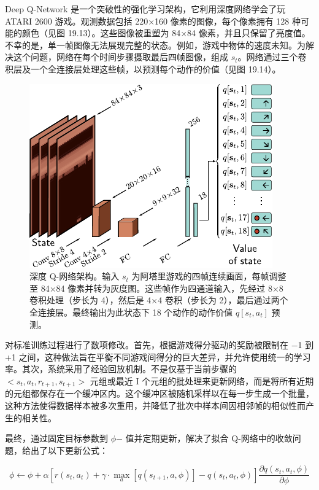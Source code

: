 \documentclass[lang=cn,newtx,10pt,scheme=chinese]{elegantbook}
\begin{document}
Deep Q-Network 是一个突破性的强化学习架构，它利用深度网络学会了玩 ATARI 2600 游戏。观测数据包括 220×160 像素的图像，每个像素拥有 128 种可能的颜色（见图 19.13）。这些图像被重塑为 84×84 像素，并且只保留了亮度值。不幸的是，单一帧图像无法展现完整的状态。例如，游戏中物体的速度未知。为解决这个问题，网络在每个时间步骤摄取最后四帧图像，组成 \(s_t\)。网络通过三个卷积层及一个全连接层处理这些帧，以预测每个动作的价值（见图 19.14）。


\begin{figure}[ht!]
\centering
\includegraphics[width=0.7\linewidth]{PDFFigures/UDLChap19PDF/ReinforceDQL2.pdf}
\caption{深度 Q-网络架构。输入 \(s_t\) 为阿塔里游戏的四帧连续画面，每帧调整至 84×84 像素并转为灰度图。这些帧作为四通道输入，先经过 8×8 卷积处理（步长为 4），然后是 4×4 卷积（步长为 2），最后通过两个全连接层。最终输出为此状态下 18 个动作的动作价值 \(q[s_t, a_t]\) 预测。}
\end{figure}

对标准训练过程进行了数项修改。首先，根据游戏得分驱动的奖励被限制在 −1 到 +1 之间，这种做法旨在平衡不同游戏间得分的巨大差异，并允许使用统一的学习率。其次，系统采用了经验回放机制。不是仅基于当前步骤的 \(<s_t, a_t, r_{t+1}, s_{t+1}>\) 元组或最近 I 个元组的批处理来更新网络，而是将所有近期的元组都保存在一个缓冲区内。这个缓冲区被随机采样以在每一步生成一个批量，这种方法使得数据样本被多次重用，并降低了批次中样本间因相邻帧的相似性而产生的相关性。

最终，通过固定目标参数到 \(\phi\)− 值并定期更新，解决了拟合 Q-网络中的收敛问题，给出了以下更新公式：

\begin{equation}
\phi \leftarrow \phi + \alpha \left[ r(s_t, a_t) + \gamma \cdot \max_a [q(s_{t+1}, a, \phi)] - q(s_t, a_t, \phi) \right] \frac{\partial q(s_t, a_t, \phi)}{\partial \phi} 
\end{equation}
\end{document}
